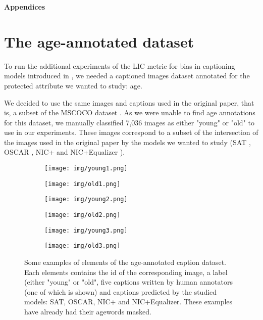 \newpage
\appendix

\textbf{\huge Appendices}
\vspace{0.15in}


\section{The age-annotated dataset}
\label{app:dataset}

To run the additional experiments of the LIC metric for bias in captioning models introduced in \cite{Hirota2022}, we needed a captioned images dataset annotated for the protected attribute we wanted to study: age. \par

We decided to use the same images and captions used in the original paper, that is, a subset of the MSCOCO dataset \cite{MSCOCO}. As we were unable to find age annotations for this dataset, we manually classified 7,036 images as either "young" or "old" to use in our experiments. These images correspond to a subset of the intersection of the images used in the original paper by the models we wanted to study (SAT \cite{SAT}, OSCAR \cite{OSCAR}, NIC+ \cite{Burns2018} and NIC+Equalizer \cite{Burns2018}).\par


\begin{figure}[bht]
     \centering
     \begin{subfigure}[b]{0.49\textwidth}
         \centering
         \texttt{[image: img/young1.png]}
     \end{subfigure}
     \hfill
     \begin{subfigure}[b]{0.49\textwidth}
         \centering
         \texttt{[image: img/old1.png]}
     \end{subfigure}
     \hfill
     \begin{subfigure}[b]{0.49\textwidth}
         \centering
         \texttt{[image: img/young2.png]}
     \end{subfigure}
     \hfill
     \begin{subfigure}[b]{0.49\textwidth}
         \centering
         \texttt{[image: img/old2.png]}
     \end{subfigure}
     \hfill
     \begin{subfigure}[b]{0.49\textwidth}
         \centering
         \texttt{[image: img/young3.png]}
     \end{subfigure}
     \hfill
     \begin{subfigure}[b]{0.49\textwidth}
         \centering
         \texttt{[image: img/old3.png]}
     \end{subfigure}
\caption{Some examples of elements of the age-annotated caption dataset. Each elements contains the id of the corresponding image, a label (either "young" or "old", five captions written by human annotators (one of which is shown) and captions predicted by the studied models: SAT, OSCAR, NIC+ and NIC+Equalizer. These examples have already had their agewords masked.}
\end{figure}

